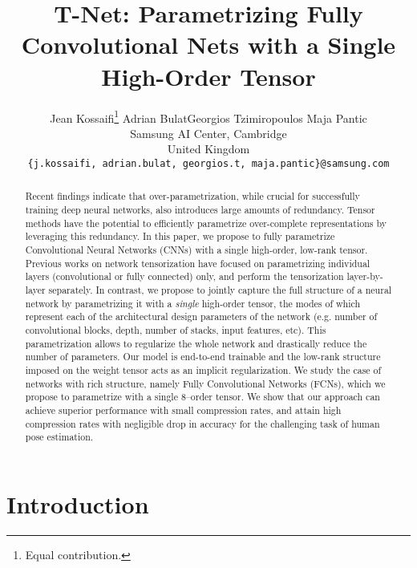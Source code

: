 \documentclass[10pt,twocolumn,letterpaper]{article}
\begin{document}
\graphicspath{{images/}}

\title{T-Net: Parametrizing Fully Convolutional Nets with a Single High-Order Tensor}


\author{Jean Kossaifi\thanks{Equal contribution.} \qquad Adrian Bulat\footnotemark[1]  \qquad Georgios Tzimiropoulos \qquad Maja Pantic
        \vspace{5pt}\\
		Samsung AI Center, Cambridge\\
		United Kingdom\\
		{\tt\small \{j.kossaifi, adrian.bulat, georgios.t, maja.pantic\}@samsung.com}
		}

\maketitle
\thispagestyle{empty}

\begin{abstract}
Recent findings indicate that over-parametrization, while crucial for successfully training deep neural networks, also introduces large amounts of redundancy. Tensor methods have the potential to efficiently parametrize over-complete representations by leveraging this redundancy. In this paper, we propose to fully parametrize Convolutional Neural Networks (CNNs) with a single high-order, low-rank tensor. Previous works on network tensorization have focused on parametrizing individual layers (convolutional or fully connected) only, and perform the tensorization layer-by-layer separately. In contrast, we propose to jointly capture the full structure of a neural network by parametrizing it with a \emph{single} high-order tensor, the modes of which represent each of the architectural design parameters of the network (e.g. number of convolutional blocks, depth, number of stacks, input features, etc). This parametrization allows to regularize the whole network and drastically reduce the number of parameters. Our model is end-to-end trainable and the low-rank structure imposed on the weight tensor acts as an implicit regularization. We study the case of networks with rich structure, namely Fully Convolutional Networks (FCNs), which we propose to parametrize with a single $8$\myth--order tensor. We show that our approach can achieve superior performance with small compression rates, and attain high compression rates with negligible drop in accuracy for the challenging task of human pose estimation.
\end{abstract}


\section{Introduction}
\end{document}
